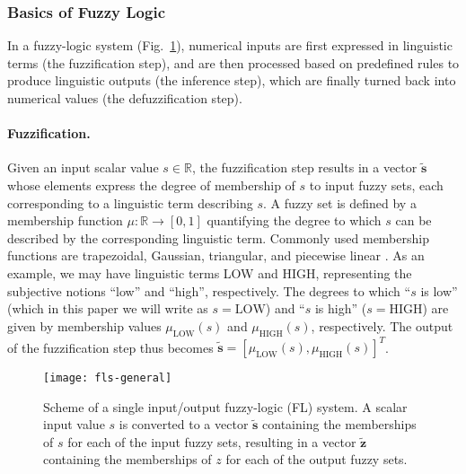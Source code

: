 \documentclass[twocolumn,natbib]{svjour3}
\begin{document}
\subsubsection{Basics of Fuzzy Logic}
\label{sec:FL}
In a fuzzy-logic system (Fig.~\ref{fig:fls-general}), numerical inputs are first expressed in linguistic terms (the fuzzification step), and are then processed based on predefined rules to produce linguistic outputs (the inference step), which are finally turned back into numerical values (the defuzzification step).

\paragraph{Fuzzification.} Given an input scalar value $s\in\mathbb{R}$, the fuzzification step results in a vector $\tilde{\mathbf{s}}$ whose elements express the degree of membership of $s$  to input fuzzy sets, each corresponding to a linguistic term describing $s$. A fuzzy set is defined by a membership function $\mu:\mathbb{R}\rightarrow[0,1]$ quantifying the degree to which $s$ can be described by the corresponding linguistic term. Commonly used membership functions are trapezoidal, Gaussian, triangular, and piecewise linear \citep{mendel1995fuzzy}. As an example, we may have linguistic terms LOW and HIGH, representing the subjective notions ``low'' and ``high'', respectively. The degrees to which ``$s$ is low'' (which in this paper we will write as $s=\textrm{LOW}$) and ``$s$ is high'' ($s=\textrm{HIGH}$) are given by membership values $\mu_{\textrm{LOW}}(s)$ and $\mu_{\textrm{HIGH}}(s)$, respectively. The output of the fuzzification step thus becomes $\tilde{\mathbf{s}}=[\mu_{\textrm{LOW}}(s),\mu_{\textrm{HIGH}}(s)]^{T}$.

\begin{figure}[!t]
\centering
\texttt{[image: fls-general]}
\caption{Scheme of a single input/output fuzzy-logic (FL) system. A scalar input value $s$ is converted to a vector $\tilde{\mathbf{s}}$ containing the memberships of $s$ for each of the input fuzzy sets, resulting in a vector $\tilde{\mathbf{z}}$ containing the memberships of $z$ for each of the output fuzzy sets.}
\label{fig:fls-general}
\end{figure}
\end{document}
